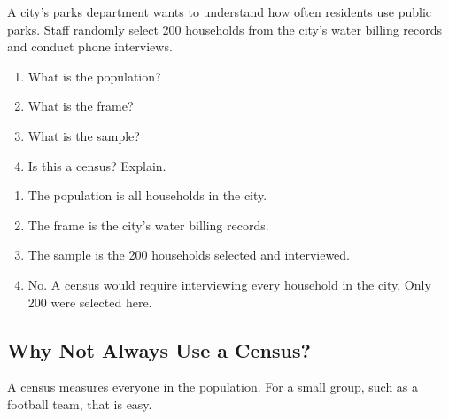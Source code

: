 \begin{Exercise}[title={Identifying the Population and Sample}, label={ex:pop-sample-1}]
A city's parks department wants to understand how often residents use public parks. Staff 
randomly select 200 households from the city's water billing records and conduct phone interviews.

\begin{enumerate} 
    \item What is the population?
    \item What is the frame?
    \item What is the sample?
    \item Is this a census? Explain.
\end{enumerate}
\end{Exercise}
\begin{Answer}[ref={ex:pop-sample-1}]
\begin{enumerate} 
    \item The population is all households in the city.
    \item The frame is the city's water billing records.
    \item The sample is the 200 households selected and interviewed.
    \item No. A census would require interviewing every household in the city. Only 200 were selected here.
\end{enumerate}
\end{Answer}

\subsection{Why Not Always Use a Census?}

A census measures everyone in the population. For a small group, such as a football team, that is easy.

